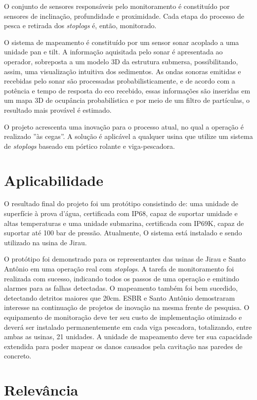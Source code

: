 \begin{itemize}
O conjunto de sensores responsáveis pelo monitoramento é constituído por
sensores de inclinação, profundidade e proximidade. Cada etapa do processo de
pesca e retirada dos \textit{stoplogs} é, então, monitorado.

O sistema de mapeamento é constituído por um sensor sonar acoplado a uma unidade
pan e tilt. A informação aquisitada pelo sonar é apresentada ao operador,
sobreposta a um modelo 3D da estrutura submersa, possibilitando, assim, uma
visualização intuitiva dos sedimentos. As ondas sonoras emitidas e recebidas pelo sonar são
processadas probabilisticamente, e de acordo com a potência e tempo de resposta
do eco recebido, essas informações são inseridas em um mapa 3D de ocupância
probabilística e por meio de um filtro de partículas, o resultado mais provável
é estimado.

O projeto acrescenta uma inovação para o processo atual, no qual a operação é
realizado ''às cegas''. A solução é aplicável a qualquer usina que utilize um
sistema de \textit{stoplogs} baseado em pórtico rolante e viga-pescadora.


\section{Aplicabilidade}

O resultado final do projeto foi um protótipo consistindo de: uma unidade de
superfície à prova d'água, certificada com IP68, capaz de suportar umidade e
altas temperaturas e uma unidade submarina, certificada com IP69K, capaz de
suportar até 100 bar de pressão. Atualmente, O sistema está instalado e sendo
utilizado na usina de Jirau.

O protótipo foi demonstrado para os representantes das usinas de Jirau e Santo
Antônio em uma operação real com \textit{stoplogs}. A tarefa de monitoramento
foi realizada com sucesso, indicando todos os passos de uma operação e emitindo
alarmes para as falhas detectadas. O mapeamento também foi bem sucedido,
detectando detritos maiores que 20cm. ESBR e Santo Antônio demostraram interesse
na continuação de projetos de inovação na mesma frente de pesquisa. O
equipamento de monitoração deve ter seu custo de implementação otimizado e
deverá ser instalado permanentemente em cada viga pescadora, totalizando, entre
ambas as usinas, 21 unidades. A unidade de mapeamento deve ter sua capacidade
extendida para poder mapear os danos causados pela cavitação nas paredes de
concreto.
 
\section{Relevância}


\end{itemize}
